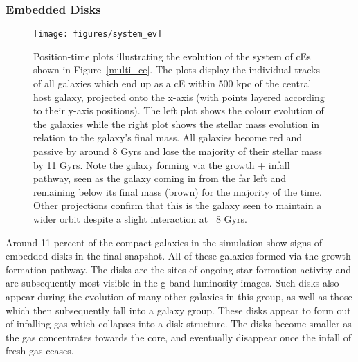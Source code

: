 \documentclass[a4paper,fleqn,usenatbib]{mnras}
\begin{document}
\subsubsection{Embedded Disks}



\begin{figure*}
\texttt{[image: figures/system\_ev]}
   \caption{Position-time plots illustrating the evolution of the system of cEs shown in Figure~\ref{multi_ce}. The plots display the individual tracks of all galaxies which end up as a cE within 500 kpc of the central host galaxy, projected onto the x-axis (with points layered according to their y-axis positions). The left plot shows the colour evolution of the galaxies while the right plot shows the stellar mass evolution in relation to the galaxy's final mass. All galaxies become red and passive by around 8 Gyrs and lose the majority of their stellar mass by 11 Gyrs. Note the galaxy forming via the growth + infall pathway, seen as the galaxy coming in from the far left and remaining below its final mass (brown) for the majority of the time. Other projections confirm that this is the galaxy seen to maintain a wider orbit despite a slight interaction at ~8 Gyrs.}
 \label{system_ev}
 \end{figure*}



Around 11 percent of the compact galaxies in the simulation show signs of embedded disks in the final snapshot. All of these galaxies formed via the growth formation pathway. The disks are the sites of ongoing star formation activity and are subsequently most visible in the g-band luminosity images. Such disks also appear during the evolution of many other galaxies in this group, as well as those which then subsequently fall into a galaxy group. These disks appear to form out of infalling gas which collapses into a disk structure. The disks become smaller as the gas concentrates towards the core, and eventually disappear once the infall of fresh gas ceases.
\end{document}
